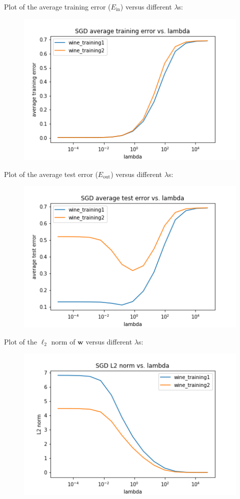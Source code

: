 Plot of the average training error ($E_\text{in}$) versus different $\lambda$s:
\noindent
\begin{figure}[H]
\centering
\includegraphics[scale=0.6]{2c_plot_train_errors.png}
\end{figure}
\noindent
Plot of the average test error ($E_\text{out}$) versus different $\lambda$s:
\noindent
\begin{figure}[H]
\centering
\includegraphics[scale=0.6]{2c_plot_test_errors.png}
\end{figure}
\noindent
Plot of the $\ell_2$ norm of $\mathbf{w}$ versus different $\lambda$s:
\noindent
\begin{figure}[H]
\centering
\includegraphics[scale=0.6]{2c_plot_l2_norms.png}
\end{figure}
\noindent

